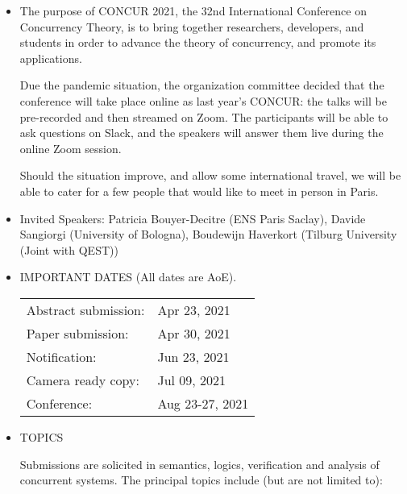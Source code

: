 \documentclass{article}
\begin{document}
\begin{itemize}\item  The purpose of CONCUR 2021, the 32nd International Conference on Concurrency Theory, is to bring together researchers, developers, and students in order to advance the theory of concurrency, and promote its applications. 
 
  Due the pandemic situation, the organization committee decided that the conference will take place online as last year's CONCUR: the talks will be pre-recorded and then streamed on Zoom. The participants will be able to ask questions on Slack, and the speakers will answer them live during the online Zoom session. 
 
  Should the situation improve, and allow some international travel, we will be able to cater for a few people that would like to meet in person in Paris. 
 
\item  Invited Speakers: Patricia Bouyer-Decitre (ENS Paris Saclay), Davide Sangiorgi (University of Bologna), Boudewijn Haverkort (Tilburg University (Joint with QEST)) 
 
\item  IMPORTANT DATES (All dates are AoE). 
 
\begin{tabulary}{\linewidth}{LL}Abstract submission:  & Apr 23, 2021 \\
Paper submission:  & Apr 30, 2021 \\
Notification:  & Jun 23, 2021 \\
Camera ready copy:  & Jul 09, 2021 \\
Conference:  & Aug 23-27, 2021 \\
\end{tabulary}
 
\item  TOPICS 
 
  Submissions are solicited in semantics, logics, verification and analysis of concurrent systems. The principal topics include (but are not limited to):   
 

\end{itemize}
\end{document}
